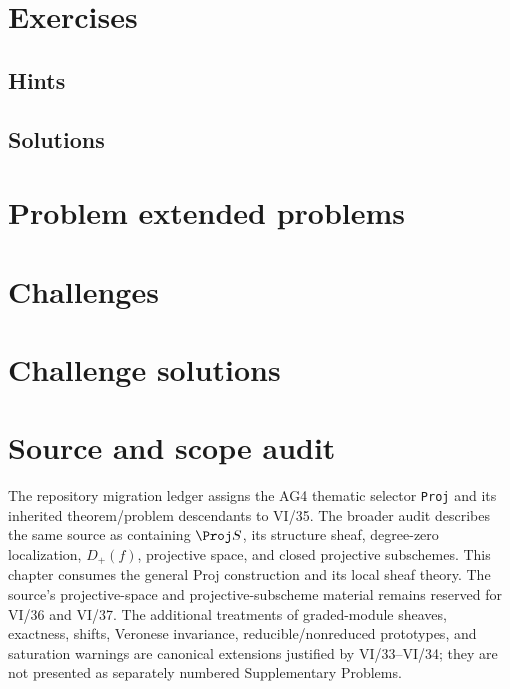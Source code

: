 \section{Exercises}


\ifdefined\IncludeExerciseHints
\subsection*{Hints}

\fi

\ifdefined\IncludeExerciseSolutions
\subsection*{Solutions}

\fi

\section{Problem extended problems}


\section{Challenges}


\ifdefined\IncludeChallengeSolutions
\section{Challenge solutions}

\fi

\section*{Source and scope audit}
The repository migration ledger assigns the AG4 thematic selector \texttt{Proj} and its inherited theorem/problem descendants to VI/35.  The broader audit describes the same source as containing \(\Proj S\), its structure sheaf, degree-zero localization, \(D_+(f)\), projective space, and closed projective subschemes.  This chapter consumes the general Proj construction and its local sheaf theory.  The source's projective-space and projective-subscheme material remains reserved for VI/36 and VI/37.  The additional treatments of graded-module sheaves, exactness, shifts, Veronese invariance, reducible/nonreduced prototypes, and saturation warnings are canonical extensions justified by VI/33--VI/34; they are not presented as separately numbered Supplementary Problems.

